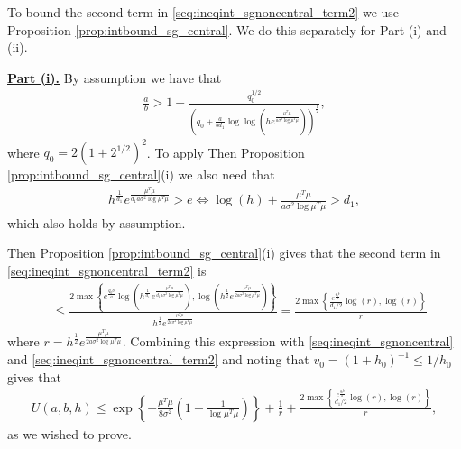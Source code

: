 To bound the second term in \eqref{seq:ineqint_sgnoncentral_term2} we use Proposition \ref{prop:intbound_sg_central}. We do this separately for Part (i) and (ii).


\vspace{3mm}
\underline{{\bf Part (i).}} By assumption we have that 
\begin{align}
 \frac{a}{b} > 1 + \frac{q_0^{1/2}}{\left(q_0 + \frac{a}{b d_1} \log\log (h e^{ \frac{\mu^T\mu}{a \sigma^2 \log \mu^T\mu}})\right)^{\frac{1}{2}}},
\nonumber
\end{align}
where $q_0= 2(1+2^{1/2})^2$. 
To apply Then Proposition \ref{prop:intbound_sg_central}(i) we also need that
\begin{align}
h^{\frac{1}{d_1}} e^{ \frac{\mu^T\mu}{d_1 a \sigma^2 \log \mu^T\mu}}  > e
\Leftrightarrow
\log(h) + \frac{\mu^T\mu}{a \sigma^2 \log \mu^T\mu} > d_1,
\nonumber
\end{align}
which also holds by assumption.

Then Proposition \ref{prop:intbound_sg_central}(i) gives that the second term in \eqref{seq:ineqint_sgnoncentral_term2} is
\begin{align}
& \leq \frac{2 \max \left\{ e^{\frac{q_0b}{a}} \log \left(h^{\frac{1}{d_1}} e^{ \frac{\mu^T\mu}{d_1 a \sigma^2 \log \mu^T\mu}}  \right) , \log \left( h^{\frac{1}{2}} e^{ \frac{\mu^T\mu}{2 a \sigma^2 \log \mu^T\mu}} \right)  \right\} }{h^{\frac{1}{2}} e^{ \frac{\mu^T\mu}{2 a \sigma^2 \log \mu^T\mu}}}
= \frac{2 \max \left\{ \frac{e^{\frac{q_0b}{a}}}{d_1/2} \log \left(r \right) , \log \left( r \right)  \right\} }{r}
\nonumber
\end{align}
where $r=h^{\frac{1}{2}} e^{ \frac{\mu^T\mu}{2 a \sigma^2 \log \mu^T\mu}}$.
Combining this expression with \eqref{seq:ineqint_sgnoncentral} and \eqref{seq:ineqint_sgnoncentral_term2} and noting that $v_0= (1+h_0)^{-1} \leq 1/h_0$ gives that
\begin{align}
 U(a,b,h) \leq \exp \left\{ -\frac{\mu^T\mu}{8\sigma^2} \left( 1 - \frac{1}{\log \mu^T\mu} \right)\right\} +
\frac{1}{r} +
\frac{2 \max \left\{ \frac{e^{\frac{q_0b}{a}}}{d_1/2} \log \left(r \right) , \log \left( r \right)  \right\} }{r},
\nonumber
\end{align}
as we wished to prove.


